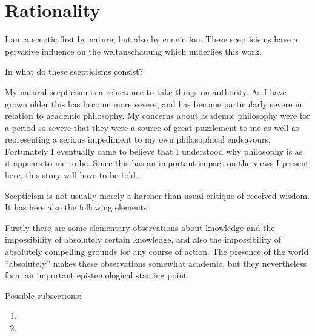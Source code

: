 \chapter{Rationality}

I am a sceptic first by nature, but also by conviction.
These scepticisms have a pervasive influence on the weltanschauung which underlies this work.

In what do these scepticisms consist?

My natural scepticism is a reluctance to take things on authority.
As I have grown older this has become more severe, and has become particularly severe in relation to academic philosophy.
My concerns about academic philosophy were for a period so severe that they were a source of great puzzlement to me as well as representing a serious impediment to my own philosophical endeavours.
Fortunately I eventually came to believe that I understood why philosophy is as it appears to me to be.
Since this has an important impact on the views I present here, this story will have to be told.

Scepticism is not usually merely a harsher than usual critique of received wisdom.
It has here also the following elements.

Firstly there are some elementary observations about knowledge and the impossibility of absolutely certain knowledge, and also the impossibility of absolutely compelling grounds for any course of action.
The presence of the world ``absolutely'' makes these observations somewhat academic, but they nevertheless form an important epistemological starting point.

Possible subsections:
\begin{enumerate}
\item
\item
\end{enumerate}
